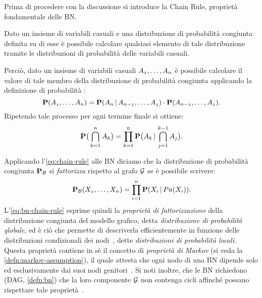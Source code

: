 Prima di procedere con la discussione si introduce la Chain Rule, proprietà fondamentale delle \acs{BN}.

\begin{teorema}
Dato un insieme di variabili casuali e una distribuzione di probabilità congiunta definita su di esse è possibile calcolare qualsiasi elemento di tale distribuzione tramite le distribuzioni di probabilità \cond*{} delle variabili casuali.
\end{teorema}

Perciò, dato un insieme di variabili casuali $\mathnormal{A_1},\dotsc,\mathnormal{A_n}$ è possibile calcolare il valore di tale membro della distribuzione di probabilità congiunta applicando la definizione di probabilità \cond*{}:
\[
\mathbf{P}(\mathnormal{A_1},\dotsc,\mathnormal{A_n})=\mathbf{P}(\mathnormal{A_n}\,\arrowvert\,\mathnormal{A_{n-1}},\dotsc,\mathnormal{A_1})\cdot\mathbf{P}(\mathnormal{A_{n-1}},\dotsc,\mathnormal{A_1})\text{.}
\]
Ripetendo tale processo per ogni termine finale si ottiene:
\begin{equation}
\label{eq:chain-rule}
\mathbf{P}\big(\bigcap_{k=1}^{n}\mathnormal{A_k}\big)=\prod_{k=1}^{n}\mathbf{P}\big(\mathnormal{A_k}\,\arrowvert\,\bigcap_{j=1}^{k-1}\mathnormal{A_j}\big)\text{.}
\end{equation}

Applicando l'\autoref{eq:chain-rule} alle \acl{BN} diciamo che la distribuzione di probabilità congiunta $\mathbf{P}_{\mathcal{B}}$ si \emph{fattorizza} rispetto al grafo $\mathcal{G}$ se è possibile scrivere:
\begin{equation}\label{eq:bn-chain-rule}
\mathbf{P}_{\mathcal{B}}(\mathnormal{X_1}, \dotsc, \mathnormal{X_n})=\prod_{i=1}^{n}\mathbf{P}(\mathnormal{X_i}\,\arrowvert\,Pa(\mathnormal{X_i}))\text{.}
\end{equation}
L'\autoref{eq:bn-chain-rule} esprime quindi la \emph{proprietà di fattorizzazione} della distribuzione congiunta del modello grafico, detta \emph{distribuzione di probabilità globale}, ed è ciò che permette di descriverla efficientemente in funzione delle distribuzioni condizionali dei nodi~\citep[][sezione 14.2]{Russel2003}, dette \emph{distribuzioni di probabilità locali}. Questa proprietà contiene in sè il concetto di \emph{proprietà di Markov} (si veda la \autoref{defn:markov-assumption}), il quale attesta che ogni nodo di una \acl{BN} dipende solo ed esclusivamente dai suoi nodi genitori~\citep[][sezione 2.2.4]{Korb2011}. Si noti inoltre, che le \acl{BN} richiedono (\acs{DAG}, \autoref{defn:bn}) che la loro componente $\mathcal{G}$ non contenga cicli  affinché possano rispettare tale proprietà~\citep[][sezione 14.1]{Russel2003}.


